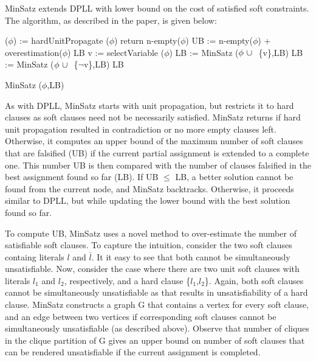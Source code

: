 MinSatz extends DPLL with lower bound on the cost of satisfied soft constraints.
The algorithm, as described in the paper, is given below:
\begin{algorithm}
 \SetAlgoLined 
 ($\phi$) := hardUnitPropagate ($\phi$)\;
    {return n-empty($\phi$)}
 UB := n-empty($\phi$) + overestimation($\phi$)\;
  {\Return LB}
 v := selectVariable ($\phi$)\;
 LB := MinSatz ($\phi ~\cup~ $ \{v\},LB)\;
 LB := MinSatz ($\phi ~\cup~ $ \{$\neg$v\},LB)\;
 \Return LB
 \caption{MinSatz ($\phi$,LB)}
\end{algorithm}
As with DPLL, MinSatz starts with unit propagation, but restricts it to hard
clauses as soft clauses need not be necessarily satisfied. MinSatz returns if
hard unit propagation resulted in contradiction or no more empty clauses left.
Otherwise, it  computes an upper bound of the maximum number of soft clauses
that are falsified (UB) if the current partial assignment is extended to a
complete one. This number UB is then compared with the number of clauses
falsified in the best assignment found so far (LB). If UB $\le$ LB, a better
solution cannot be found from the current node, and MinSatz backtracks.
Otherwise, it proceeds similar to DPLL, but while updating the lower bound with
the best solution found so far.

To compute UB, MinSatz uses a novel method to over-estimate the number of
satisfiable soft clauses. To capture the intuition, consider the two soft
clauses containg literals $l$ and $\bar{l}$. It it easy to see that both cannot
be simultaneously unsatisfiable. Now, consider the case where there are two unit
soft clauses with literals $l_1$ and $l_2$, respectively, and a hard clause
\{$l_1$,$l_2$\}. Again, both soft clauses cannot be simultaneously unsatisfiable
as that results in unsatisfiability of a hard clause. MinSatz constructs a graph
G that contains a vertex for every soft clause, and an edge between two vertices
if corresponding soft clauses cannot be simultaneously unsatisfiable (as
described above). Observe that number of cliques in the clique partition of G
gives an upper bound on number of soft clauses that can be rendered
unsatisfiable if the current assignment is completed. 

